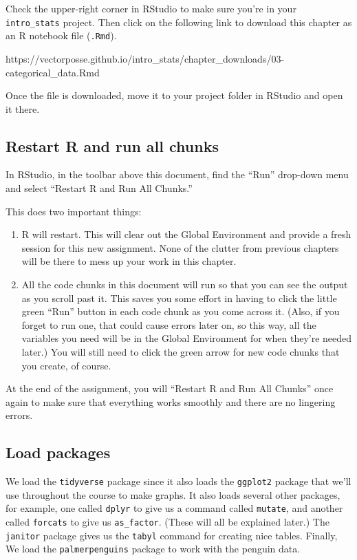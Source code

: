 \documentclass[
]{book}
\providecommand{\tightlist}{%
  \setlength{\itemsep}{0pt}\setlength{\parskip}{0pt}}
\begin{document}
Check the upper-right corner in RStudio to make sure you're in your \texttt{intro\_stats} project. Then click on the following link to download this chapter as an R notebook file (\texttt{.Rmd}).

https://vectorposse.github.io/intro\_stats/chapter\_downloads/03-categorical\_data.Rmd

Once the file is downloaded, move it to your project folder in RStudio and open it there.

\hypertarget{categorical-restart}{%
\subsection{Restart R and run all chunks}\label{categorical-restart}}

In RStudio, in the toolbar above this document, find the ``Run'' drop-down menu and select ``Restart R and Run All Chunks.''

This does two important things:

\begin{enumerate}
\def\labelenumi{\arabic{enumi}.}
\tightlist
\item
  R will restart. This will clear out the Global Environment and provide a fresh session for this new assignment. None of the clutter from previous chapters will be there to mess up your work in this chapter.
\item
  All the code chunks in this document will run so that you can see the output as you scroll past it. This saves you some effort in having to click the little green ``Run'' button in each code chunk as you come across it. (Also, if you forget to run one, that could cause errors later on, so this way, all the variables you need will be in the Global Environment for when they're needed later.) You will still need to click the green arrow for new code chunks that you create, of course.
\end{enumerate}

At the end of the assignment, you will ``Restart R and Run All Chunks'' once again to make sure that everything works smoothly and there are no lingering errors.

\hypertarget{categorical-load}{%
\subsection{Load packages}\label{categorical-load}}

We load the \texttt{tidyverse} package since it also loads the \texttt{ggplot2} package that we'll use throughout the course to make graphs. It also loads several other packages, for example, one called \texttt{dplyr} to give us a command called \texttt{mutate}, and another called \texttt{forcats} to give us \texttt{as\_factor}. (These will all be explained later.) The \texttt{janitor} package gives us the \texttt{tabyl} command for creating nice tables. Finally, We load the \texttt{palmerpenguins} package to work with the penguin data.
\end{document}
